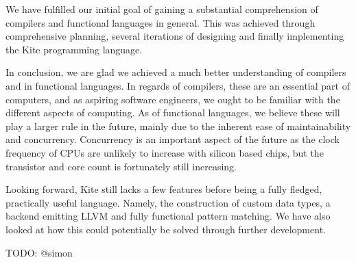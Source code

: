 
We have fulfilled our initial goal of gaining a substantial comprehension of compilers and functional languages in general. This was achieved through comprehensive planning, several iterations of designing and finally implementing the Kite programming language.

In conclusion, we are glad we achieved a much better understanding of compilers and in functional languages. In regards of compilers, these are an essential part of computers, and as aspiring software engineers, we ought to be familiar with the different aspects of computing. As of functional languages, we believe these will play a larger rule in the future, mainly due to the inherent ease of maintainability and concurrency. Concurrency is an important aspect of the future as the clock frequency of CPUs are unlikely to increase with silicon based chips, but the transistor and core count is fortunately still increasing.

Looking forward, Kite still lacks a few features before being a fully fledged, practically useful language. Namely, the construction of custom data types, a backend emitting LLVM and fully functional pattern matching. We have also looked at how this could potentially be solved through further development.

TODO: @simon